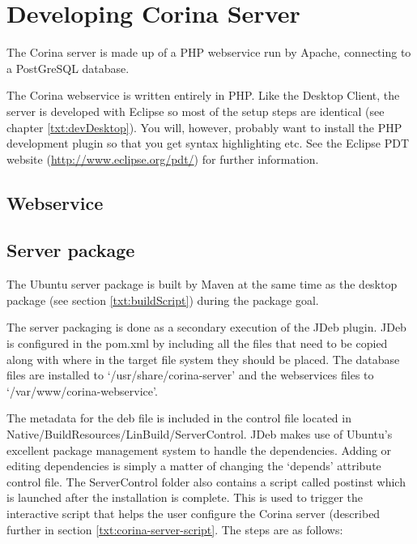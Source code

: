 \chapter{Developing Corina Server}

The Corina server is made up of a PHP webservice run by Apache, connecting to a PostGreSQL database.  

The Corina webservice is written entirely in PHP.  Like the Desktop Client, the server is developed with Eclipse so most of the setup steps are identical (see chapter \ref{txt:devDesktop}).  You will, however, probably want to install the PHP development plugin so that you get syntax highlighting etc.  See the Eclipse PDT website (\url{http://www.eclipse.org/pdt/}) for further information.


\section{Webservice }

\section{Server package}
\label{txt:serverPackage}
The Ubuntu server package is built by Maven at the same time as the desktop package (see section \ref{txt:buildScript}) during the package goal.  

The server packaging is done as a secondary execution of the JDeb plugin.  JDeb is configured in the pom.xml by including all the files that need to be copied along with where in the target file system they should be placed. The database files are installed to `/usr/share/corina-server' and the webservices files to `/var/www/corina-webservice'. 

The metadata for the deb file is included in the control file located in Native/BuildResources/LinBuild/ServerControl.  JDeb makes use of Ubuntu's excellent package management system to handle the dependencies.  Adding or editing dependencies is simply a matter of changing the `depends' attribute control file.  The ServerControl folder also contains a script called postinst which is launched after the installation is complete.  This is used to trigger the interactive script that helps the user configure the Corina server (described further in section \ref{txt:corina-server-script}.  The steps are as follows:  

